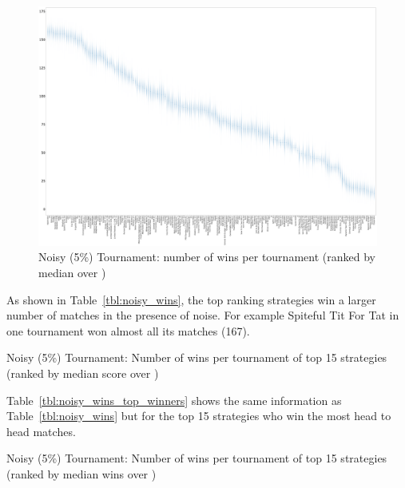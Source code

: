 \documentclass{article}
\begin{document}
\begin{landscape}
    \begin{figure}[!hbtp]
        \centering
        \includegraphics[width=\paperwidth]{./assets/noisy_wins_boxplots.pdf}
        \caption{Noisy (5\%) Tournament: number of wins per tournament (ranked by
        median over
        \protecttournaments)}
        \label{fig:noisy_winplot}
    \end{figure}
\end{landscape}

As shown in Table~\ref{tbl:noisy_wins}, the top ranking strategies win a larger
number of matches in the presence of noise. For example Spiteful Tit For Tat in
one tournament won almost all its matches (167).

\begin{table}[!hbtp]
    \centering
        
        \caption{Noisy (5\%) Tournament: Number of wins per tournament
        of top 15 strategies (ranked by median score over
        \protecttournaments)}
        \label{tbl:noisy_wins}
\end{table}

Table~\ref{tbl:noisy_wins_top_winners} shows the same information as
Table~\ref{tbl:noisy_wins} but for the top 15 strategies who win the most
head to head matches.

\begin{table}[!hbtp]
    \centering
        
        \caption{Noisy (5\%) Tournament: Number of wins per tournament
        of top 15 strategies (ranked by median wins over
        \protecttournaments)}
        \label{tbl:noisy_wins_top_winners}
\end{table}
\end{document}
